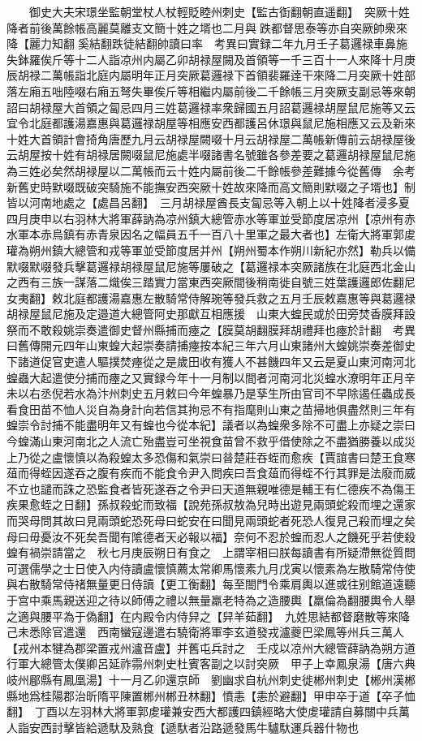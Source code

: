　　御史大夫宋璟坐監朝堂杖人杖輕貶睦州刺史【監古衘翻朝直遥翻】　突厥十姓降者前後萬餘帳高麗莫離支文簡十姓之壻也二月與跌都督思泰等亦自突厥帥衆來降【麗力知翻奚結翻跌徒結翻帥讀曰率　考異曰實録二年九月壬子葛邏禄車鼻施失鉢羅俟斤等十二人詣凉州内屬乙卯胡禄屋闕及首領等一千三百十一人來降十月庚辰胡禄二萬帳詣北庭内屬明年正月突厥葛邏禄下首領裴羅逹干來降二月突厥十姓部落左廂五咄陸啜右廂五弩失畢俟斤等相繼内屬前後二千餘帳三月突厥支副忌等來朝詔曰胡禄屋大首領之匐忌四月三姓葛邏禄率衆歸國五月詔葛邏禄胡屋鼠尼施等又云宜令北庭都護湯嘉惠與葛邏禄胡屋等相應安西都護呂休璟與鼠尼施相應又云及新來十姓大首領計會掎角唐歷九月云胡禄屋闕啜十月云胡禄屋二萬帳新傳前云胡禄屋後云胡屋按十姓有胡禄居闕啜鼠尼施處半啜諸書名號雖各參差要之葛邏胡禄屋鼠尼施為三姓必矣然胡禄屋以二萬帳而云十姓内屬前後二千餘帳參差難據今從舊傳　余考新舊史時默啜既破突騎施不能撫安西突厥十姓故來降而高文簡則默啜之子壻也】制皆以河南地處之【處昌呂翻】　三月胡禄屋酋長支匐忌等入朝上以十姓降者浸多夏四月庚申以右羽林大將軍薛訥為凉州鎮大總管赤水等軍並受節度居凉州【凉州有赤水軍本赤烏鎮有赤青泉因名之幅員五千一百八十里軍之最大者也】左衛大將軍郭䖍瓘為朔州鎮大總管和戎等軍並受節度居并州【朔州蜀本作朔川新紀亦然】勒兵以備默啜默啜發兵擊葛邏禄胡禄屋鼠尼施等屢破之【葛邏禄本突厥諸族在北庭西北金山之西有三族一謀落二熾俟三踏實力當東西突厥間後稍南徙自號三姓葉護邏郎佐翻尼女夷翻】敕北庭都護湯嘉惠左散騎常侍解琬等發兵救之五月壬辰敕嘉惠等與葛邏禄胡禄屋鼠尼施及定邉道大總管阿史那獻互相應援　山東大蝗民或於田旁焚香膜拜設祭而不敢殺姚崇奏遣御史督州縣捕而瘞之【膜莫胡翻膜拜胡禮拜也瘞於計翻　考異曰舊傳開元四年山東蝗大起崇奏請捕瘞按本紀三年六月山東諸州大蝗姚崇奏差御史下諸道促官吏遣人驅撲焚瘞從之是歲田收有獲人不甚饑四年又云是夏山東河南河北蝗蟲大起遣使分捕而瘞之又實録今年十一月制以間者河南河北災蝗水潦明年正月辛未以右丞倪若水為汴州刺史五月敕曰今年蝗暴乃是孶生所由官司不早除遏任蟲成長看食田苗不恤人災自為身計向若信其拘忌不有指麾則山東之苗掃地俱盡然則三年有蝗崇令討捕不能盡明年又有蝗也今從本紀】議者以為蝗衆多除不可盡上亦疑之崇曰今蝗滿山東河南北之人流亡殆盡豈可坐視食苗曾不救乎借使除之不盡猶勝養以成災上乃從之盧懷慎以為殺蝗太多恐傷和氣崇曰㫺楚莊吞蛭而愈疾【賈誼書曰楚王食寒葅而得蛭因遂吞之腹有疾而不能食令尹入問疾曰吾食葅而得蛭不行其罪是法廢而威不立也譴而誅之恐監食者皆死遂吞之令尹曰天道無親唯德是輔王有仁德疾不為傷王疾果愈蛭之日翻】孫叔殺蛇而致福【說苑孫叔敖為兒時出遊見兩頭蛇殺而埋之還家而哭母問其故曰見兩頭蛇恐死母曰蛇安在曰聞見兩頭蛇者死恐人復見己殺而埋之矣母曰毋憂汝不死矣吾聞有隂德者天必報以福】奈何不忍於蝗而忍人之饑死乎若使殺蝗有禍崇請當之　秋七月庚辰朔日有食之　上謂宰相曰朕每讀書有所疑滯無從質問可選儒學之士日使入内侍讀盧懷慎薦太常卿馬懷素九月戊寅以懷素為左散騎常侍使與右散騎常侍禇無量更日侍讀【更工衡翻】每至閤門令乘肩輿以進或往别館道遠聽于宫中乘馬親送迎之待以師傅之禮以無量羸老特為之造腰輿【羸倫為翻腰輿令人舉之適與腰平為于偽翻】在内殿令内侍舁之【舁羊茹翻】　九姓思結都督磨散等來降己未悉除官遣還　西南蠻寇邊遣右驍衛將軍李玄道發戎瀘夔巴梁鳳等州兵三萬人【戎州本犍為郡梁置戎州瀘音盧】并舊屯兵討之　壬戍以凉州大總管薛訥為朔方道行軍大總管太僕卿呂延祚霛州刺史杜賓客副之以討突厥　甲子上幸鳳泉湯【唐六典岐州郿縣有鳳凰湯】十一月乙卯還京師　劉幽求自杭州刺史徙郴州刺史【郴州漢郴縣地爲桂陽郡治昕隋平陳置郴州郴丑林翻】憤恚【恚於避翻】甲申卒于道【卒子恤翻】　丁酉以左羽林大將軍郭䖍瓘兼安西大都護四鎮經略大使䖍瓘請自募關中兵萬人詣安西討擊皆給遞馱及熟食【遞馱者沿路遞發馬牛驢馱運兵器什物也